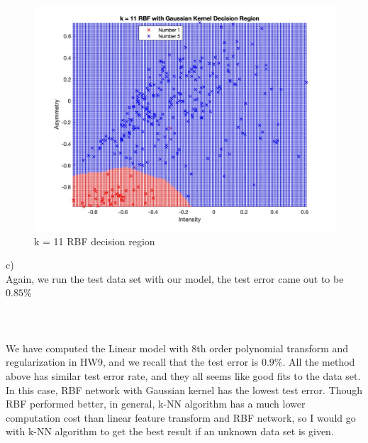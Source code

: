 \documentclass[12pt]{article}
\begin{document}
\begin{figure}[H]
  \centering
  \includegraphics[scale = 0.27]{5.jpg}
  \caption{k = 11 RBF decision region}
  \label{fig:5}
\end{figure}
\noindent c)\\
\indent Again, we run the test data set with our model, the test error came out to be $0.85\%$\\\\

 \\\\
\indent We have computed the Linear model with 8th order polynomial transform and regularization in HW9, and we recall that the test error is $0.9\%$.  All the method above has similar test error rate, and they all seems like good fits to the data set. In this case, RBF network with Gaussian kernel has the lowest test error. Though RBF performed better, in general, k-NN algorithm has a much lower computation cost than linear feature transform and RBF network, so I would go with k-NN algorithm to get the best result if an unknown data set is given.
\end{document}

